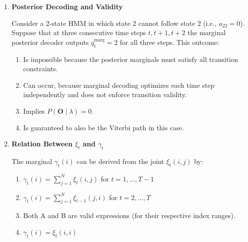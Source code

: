 \documentclass[12pt]{article}
\begin{document}
\begin{enumerate}[label=\textbf{Q\arabic*.}, leftmargin=*, itemsep=2em]
\begin{enumerate}[label=\Alph*.]
    \item $\displaystyle \log P(\mathbf{O}\mid\lambda)
          = \sum_{t=1}^{T} \log c_t$
    \item $\displaystyle \log P(\mathbf{O}\mid\lambda)
          = \prod_{t=1}^{T} c_t$
    \item $\displaystyle \log P(\mathbf{O}\mid\lambda)
          = -\sum_{t=1}^{T} \log c_t$
    \item $\displaystyle \log P(\mathbf{O}\mid\lambda)
          = \log\!\left(\sum_{t=1}^{T} c_t\right)$
\end{enumerate}

\item \textbf{Posterior Decoding and Validity}

Consider a 2-state HMM in which state 2 cannot follow state 2
(i.e., $a_{22} = 0$). Suppose that at three consecutive time steps
$t, t+1, t+2$ the marginal posterior decoder outputs $\hat{q}_t^{\text{marg}} = 2$
for all three steps. This outcome:

\begin{enumerate}[label=\Alph*.]
    \item Is impossible because the posterior marginals must satisfy all transition constraints.
    \item Can occur, because marginal decoding optimizes each time step independently
          and does not enforce transition validity.
    \item Implies $P(\mathbf{O}\mid\lambda) = 0$.
    \item Is guaranteed to also be the Viterbi path in this case.
\end{enumerate}

\item \textbf{Relation Between $\xi_t$ and $\gamma_t$}

The marginal $\gamma_t(i)$ can be derived from the joint $\xi_t(i,j)$ by:

\begin{enumerate}[label=\Alph*.]
    \item $\displaystyle \gamma_t(i) = \sum_{j=1}^{N} \xi_t(i,j)$
          for $t = 1, \dots, T-1$
    \item $\displaystyle \gamma_t(i) = \sum_{j=1}^{N} \xi_{t-1}(j,i)$
          for $t = 2, \dots, T$
    \item Both A and B are valid expressions (for their respective index ranges).
    \item $\displaystyle \gamma_t(i) = \xi_t(i,i)$
\end{enumerate}

\end{enumerate}
\end{document}
